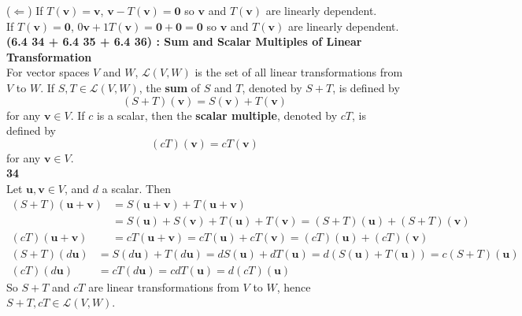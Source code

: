 ($\Leftarrow$) If $T(\textbf{v}) = \textbf{v}$, $\textbf{v} - T(\textbf{v}) = \textbf{0}$ so $\textbf{v}$ and $T(\textbf{v})$ are linearly dependent. \\

If $T(\textbf{v}) = \textbf{0}$, $0\textbf{v} + 1T(\textbf{v}) = \textbf{0} + \textbf{0} = \textbf{0}$ so $\textbf{v}$ and $T(\textbf{v})$ are linearly dependent. \\

\textbf{(6.4 34 + 6.4 35 + 6.4 36) : Sum and Scalar Multiples of Linear Transformation} \\
For vector spaces $V$ and $W$, $\mathscr{L}(V, W)$ is the set of all linear transformations from $V$ to $W$. If $S, T \in \mathscr{L}(V, W)$, the \textbf{sum} of $S$ and $T$, denoted by $S + T$, is defined by \begin{equation*}
	(S + T)(\textbf{v}) = S(\textbf{v}) + T(\textbf{v})
\end{equation*} for any $\textbf{v} \in V$. If $c$ is a scalar, then the \textbf{scalar multiple}, denoted by $cT$, is defined by \begin{equation*}
	(cT)(\textbf{v}) = cT(\textbf{v})
\end{equation*} for any $\textbf{v} \in V$. \\

\textbf{34} \\
Let $\textbf{u}, \textbf{v} \in V$, and $d$ a scalar. Then \begin{align*}
(S + T)(\textbf{u} + \textbf{v}) &= S(\textbf{u} + \textbf{v}) + T(\textbf{u} + \textbf{v}) \\
&= S(\textbf{u}) + S(\textbf{v}) + T(\textbf{u}) + T(\textbf{v}) = (S + T)(\textbf{u}) + (S + T)(\textbf{v}) \\
(cT)(\textbf{u} + \textbf{v}) &= cT(\textbf{u} + \textbf{v}) = cT(\textbf{u}) + cT(\textbf{v}) = (cT)(\textbf{u}) + (cT)(\textbf{v})
\end{align*} \begin{align*}
(S + T)(d\textbf{u}) &= S(d\textbf{u}) + T(d\textbf{u}) = dS(\textbf{u}) + dT(\textbf{u}) = d(S(\textbf{u}) + T(\textbf{u})) = c(S + T)(\textbf{u}) \\
(cT)(d\textbf{u}) &= cT(d\textbf{u}) = cdT(\textbf{u}) = d(cT)(\textbf{u})
\end{align*}
So $S + T$ and $cT$ are linear transformations from $V$ to $W$, hence $S + T, cT \in \mathscr{L}(V, W)$. \\

